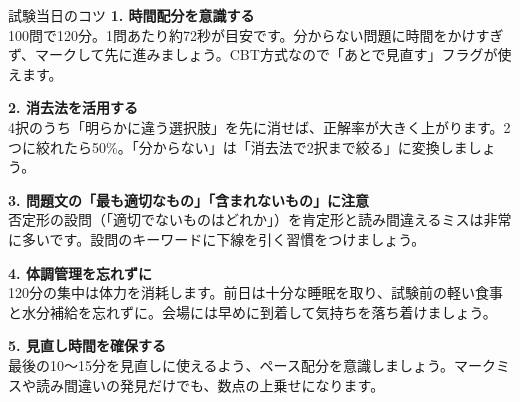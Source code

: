 \begin{column}{試験当日のコツ}
\textbf{1. 時間配分を意識する}\\
100問で120分。1問あたり約72秒が目安です。分からない問題に時間をかけすぎず、マークして先に進みましょう。CBT方式なので「あとで見直す」フラグが使えます。

\vspace{0.5em}
\textbf{2. 消去法を活用する}\\
4択のうち「明らかに違う選択肢」を先に消せば、正解率が大きく上がります。2つに絞れたら50\%。「分からない」は「消去法で2択まで絞る」に変換しましょう。

\vspace{0.5em}
\textbf{3. 問題文の「最も適切なもの」「含まれないもの」に注意}\\
否定形の設問（「適切でないものはどれか」）を肯定形と読み間違えるミスは非常に多いです。設問のキーワードに下線を引く習慣をつけましょう。

\vspace{0.5em}
\textbf{4. 体調管理を忘れずに}\\
120分の集中は体力を消耗します。前日は十分な睡眠を取り、試験前の軽い食事と水分補給を忘れずに。会場には早めに到着して気持ちを落ち着けましょう。

\vspace{0.5em}
\textbf{5. 見直し時間を確保する}\\
最後の10〜15分を見直しに使えるよう、ペース配分を意識しましょう。マークミスや読み間違いの発見だけでも、数点の上乗せになります。
\end{column}


